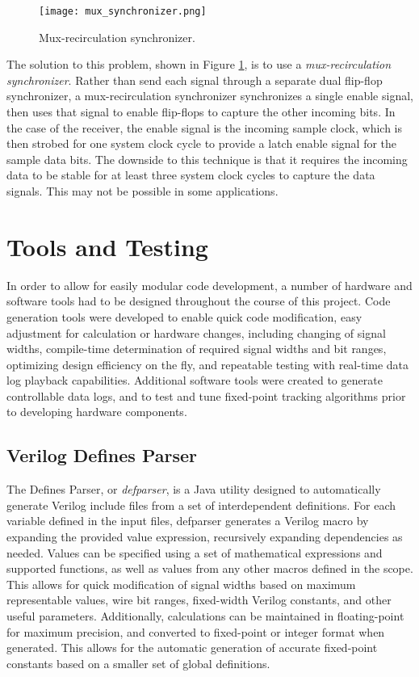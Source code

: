 \documentclass[12pt]{article}
\begin{document}
\begin{figure}
\centering
\texttt{[image: mux\_synchronizer.png]}
\caption{Mux-recirculation synchronizer.}
\label{img:mux synchronizer}
\end{figure}

The solution to this problem, shown in Figure \ref{img:mux synchronizer}, is to use a \emph{mux-recirculation synchronizer}. Rather than send each signal through a separate dual flip-flop synchronizer, a mux-recirculation synchronizer synchronizes a single enable signal, then uses that signal to enable flip-flops to capture the other incoming bits. In the case of the receiver, the enable signal is the incoming sample clock, which is then strobed for one system clock cycle to provide a latch enable signal for the sample data bits. The downside to this technique is that it requires the incoming data to be stable for at least three system clock cycles to capture the data signals. This may not be possible in some applications.

\section{Tools and Testing}
\label{sec:tools}
In order to allow for easily modular code development, a number of hardware and software tools had to be designed throughout the course of this project. Code generation tools were developed to enable quick code modification, easy adjustment for calculation or hardware changes, including changing of signal widths, compile-time determination of required signal widths and bit ranges, optimizing design efficiency on the fly, and repeatable testing with real-time data log playback capabilities. Additional software tools were created to generate controllable data logs, and to test and tune fixed-point tracking algorithms prior to developing hardware components.

\subsection{Verilog Defines Parser}
The Defines Parser, or \emph{defparser}, is a Java utility designed to automatically generate Verilog include files from a set of interdependent definitions. For each variable defined in the input files, defparser generates a Verilog macro by expanding the provided value expression, recursively expanding dependencies as needed. Values can be specified using a set of mathematical expressions and supported functions, as well as values from any other macros defined in the scope. This allows for quick modification of signal widths based on maximum representable values, wire bit ranges, fixed-width Verilog constants, and other useful parameters. Additionally, calculations can be maintained in floating-point for maximum precision, and converted to fixed-point or integer format when generated. This allows for the automatic generation of accurate fixed-point constants based on a smaller set of global definitions.
\end{document}
